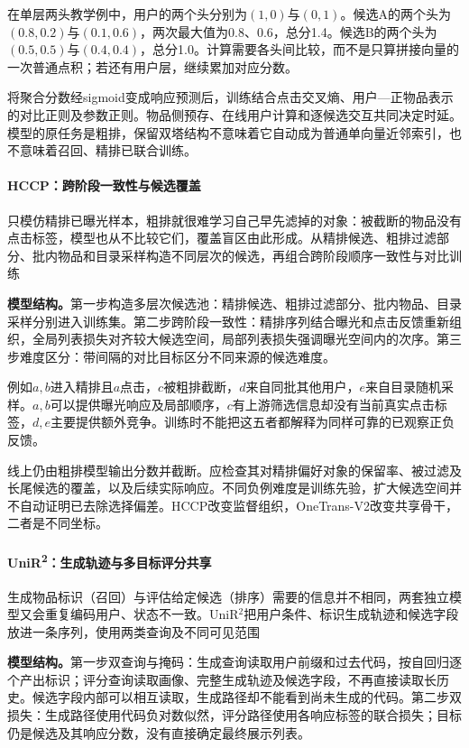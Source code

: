 在单层两头教学例中，用户的两个头分别为$(1,0)$与$(0,1)$。候选A的两个头为$(0.8,0.2)$与$(0.1,0.6)$，两次最大值为0.8、0.6，总分1.4。候选B的两个头为$(0.5,0.5)$与$(0.4,0.4)$，总分1.0。计算需要各头间比较，而不是只算拼接向量的一次普通点积；若还有用户层，继续累加对应分数。

将聚合分数经sigmoid变成响应预测后，训练结合点击交叉熵、用户—正物品表示的对比正则及参数正则。物品侧预存、在线用户计算和逐候选交互共同决定时延。模型的原任务是粗排，保留双塔结构不意味着它自动成为普通单向量近邻索引，也不意味着召回、精排已联合训练。

\paragraph{HCCP：跨阶段一致性与候选覆盖}
\label{sec:rs-hccp}

只模仿精排已曝光样本，粗排就很难学习自己早先滤掉的对象：被截断的物品没有点击标签，模型也从不比较它们，覆盖盲区由此形成。从精排候选、粗排过滤部分、批内物品和目录采样构造不同层次的候选，再组合跨阶段顺序一致性与对比训练

\textbf{模型结构。}第一步构造多层次候选池：精排候选、粗排过滤部分、批内物品、目录采样分别进入训练集。第二步跨阶段一致性：精排序列结合曝光和点击反馈重新组织，全局列表损失对齐较大候选空间，局部列表损失强调曝光空间内的次序。第三步难度区分：带间隔的对比目标区分不同来源的候选难度。

例如$a,b$进入精排且$a$点击，$c$被粗排截断，$d$来自同批其他用户，$e$来自目录随机采样。$a,b$可以提供曝光响应及局部顺序，$c$有上游筛选信息却没有当前真实点击标签，$d,e$主要提供额外竞争。训练时不能把这五者都解释为同样可靠的已观察正负反馈。

线上仍由粗排模型输出分数并截断。应检查其对精排偏好对象的保留率、被过滤及长尾候选的覆盖，以及后续实际响应。不同负例难度是训练先验，扩大候选空间并不自动证明已去除选择偏差。HCCP改变监督组织，OneTrans-V2改变共享骨干，二者是不同坐标。

\paragraph{UniR\textsuperscript{2}：生成轨迹与多目标评分共享}
\label{sec:rs-unir2}

生成物品标识（召回）与评估给定候选（排序）需要的信息并不相同，两套独立模型又会重复编码用户、状态不一致。UniR$^2$把用户条件、标识生成轨迹和候选字段放进一条序列，使用两类查询及不同可见范围

\textbf{模型结构。}第一步双查询与掩码：生成查询读取用户前缀和过去代码，按自回归逐个产出标识；评分查询读取画像、完整生成轨迹及候选字段，不再直接读取长历史。候选字段内部可以相互读取，生成路径却不能看到尚未生成的代码。第二步双损失：生成路径使用代码负对数似然，评分路径使用各响应标签的联合损失；目标仍是候选及其响应分数，没有直接确定最终展示列表。

